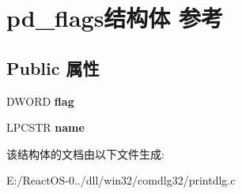 \hypertarget{structpd__flags}{}\section{pd\+\_\+flags结构体 参考}
\label{structpd__flags}
\subsection*{Public 属性}
\begin{DoxyCompactItemize}
\item 
\mbox{\label{structpd__flags_a450898f0660bd37854eb05d4b69dffe9}} 
D\+W\+O\+RD {\bfseries flag}
\item 
\mbox{\label{structpd__flags_a82b3ae13d04259a22547b7276c48f16c}} 
L\+P\+C\+S\+TR {\bfseries name}
\end{DoxyCompactItemize}


该结构体的文档由以下文件生成\+:\begin{DoxyCompactItemize}
\item 
E\+:/\+React\+O\+S-\/0../dll/win32/comdlg32/printdlg.\+c\end{DoxyCompactItemize}
